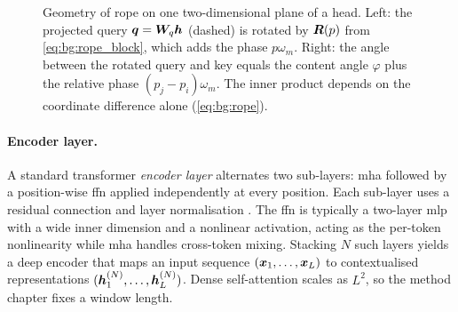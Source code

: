 \begin{figure}[tbp]
  \centering
  
  \caption{Geometry of \gls{rope} on one two-dimensional plane of a head. Left: the projected query $\bm{q}=\bm{W}_q\bm{h}$ (dashed) is rotated by $\bm{R}(p)$ from \cref{eq:bg:rope_block}, which adds the phase $p\omega_m$. Right: the angle between the rotated query and key equals the content angle $\varphi$ plus the relative phase $(p_j-p_i)\omega_m$. The inner product depends on the coordinate difference alone (\cref{eq:bg:rope}).}
  \label{fig:bg:rope}
\end{figure}

\paragraph{Encoder layer.}
A standard transformer \emph{encoder layer} alternates two sub-layers: \gls{mha} followed by a position-wise \gls{ffn} applied independently at every position.
Each sub-layer uses a residual connection and layer normalisation \parencite{vaswani2017attention}.
The \gls{ffn} is typically a two-layer \gls{mlp} with a wide inner dimension and a nonlinear activation, acting as the per-token nonlinearity while \gls{mha} handles cross-token mixing.
Stacking $N$ such layers yields a deep encoder that maps an input sequence $(\bm{x}_1,\ldots,\bm{x}_L)$ to contextualised representations $(\bm{h}^{(N)}_1,\ldots,\bm{h}^{(N)}_L)$.
Dense self-attention scales as $L^{2}$, so the method chapter fixes a window length.
